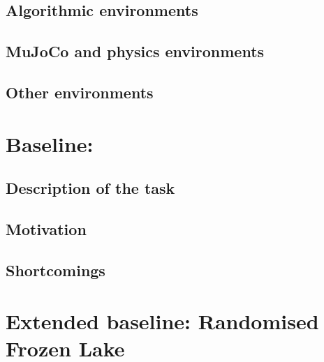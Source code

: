 \subsection{Algorithmic environments}
\subsection{MuJoCo and physics environments}
\subsection{Other environments}


\section{Baseline: }
\subsection{Description of the task}
\subsection{Motivation}
\subsection{Shortcomings}

\section{Extended baseline: Randomised Frozen Lake}